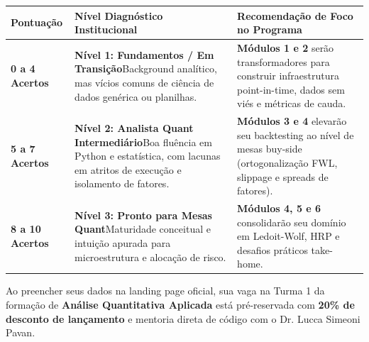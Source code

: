 \documentclass[11pt,a4paper]{article}
\begin{document}
\begin{table}[h]
\centering
\begin{tabular}{p{} p{} p{}}
\toprule
\textbf{Pontuação} & \textbf{Nível Diagnóstico Institucional} & \textbf{Recomendação de Foco no Programa} \\
\midrule
\textbf{0 a 4 Acertos} & \textbf{Nível 1: Fundamentos / Em Transição}\newline Background analítico, mas vícios comuns de ciência de dados genérica ou planilhas. & \textbf{Módulos 1 e 2} serão transformadores para construir infraestrutura point-in-time, dados sem viés e métricas de cauda. \\
\midrule
\textbf{5 a 7 Acertos} & \textbf{Nível 2: Analista Quant Intermediário}\newline Boa fluência em Python e estatística, com lacunas em atritos de execução e isolamento de fatores. & \textbf{Módulos 3 e 4} elevarão seu backtesting ao nível de mesas buy-side (ortogonalização FWL, slippage e spreads de fatores). \\
\midrule
\textbf{8 a 10 Acertos} & \textbf{Nível 3: Pronto para Mesas Quant}\newline Maturidade conceitual e intuição apurada para microestrutura e alocação de risco. & \textbf{Módulos 4, 5 e 6} consolidarão seu domínio em Ledoit-Wolf, HRP e desafios práticos take-home. \\
\bottomrule
\end{tabular}
\end{table}

\vspace{10pt}

\begin{answerbox}
Ao preencher seus dados na landing page oficial, sua vaga na Turma 1 da formação de \textbf{Análise Quantitativa Aplicada} está pré-reservada com \textbf{20\% de desconto de lançamento} e mentoria direta de código com o Dr. Lucca Simeoni Pavan.
\end{answerbox}
\end{document}
